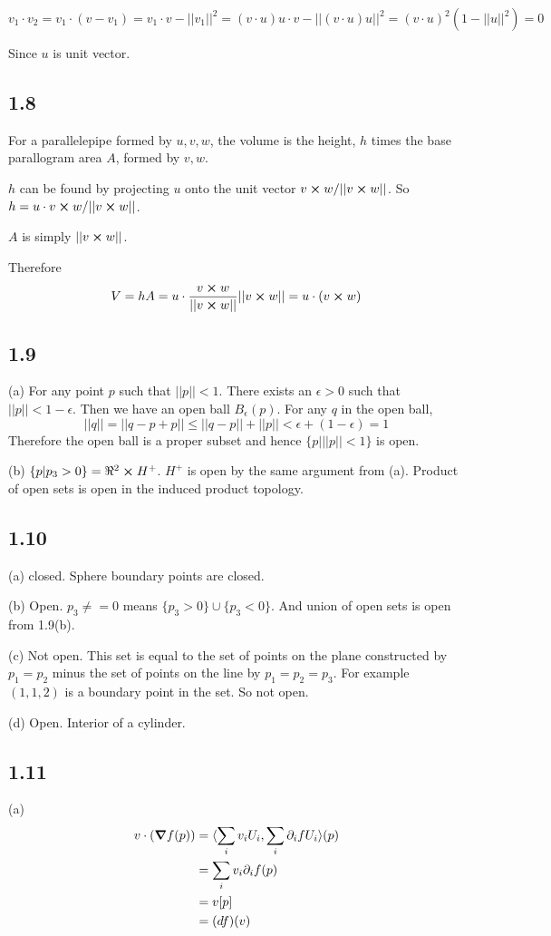 \documentclass[12pt]{article}
\begin{document}
$$ v_1 \cdot v_2 = v_1 \cdot (v - v_1) = v_1 \cdot v - ||v_1||^2 = (v \cdot u)u \cdot v - ||(v\cdot u) u||^2 = (v \cdot u)^2 (1 - ||u||^2) = 0$$ 

Since $u$ is unit vector.

\subsection*{1.8}
For a parallelepipe formed by $u, v, w$, the volume is the height, $h$ times the base parallogram area $A$, formed by $v, w$. 

$h$ can be found by projecting $u$ onto the unit vector $v\cross w / ||v\cross  w||$. So $h = u \cdot v\cross w / ||v\cross  w||$.

$A$ is simply $||v\cross  w||$. 

Therefore$$V = hA = u \cdot \frac{v\cross w}{||v\cross  w||} ||v\cross  w|| = u \cdot (v \cross w)$$

\subsection*{1.9}
(a) For any point $p$ such that $||p||<1$. There exists an $\epsilon > 0$ such that $||p|| < 1 -  \epsilon$. Then we have an open ball $B_\epsilon(p)$. For any $q$ in the open ball,  $$||q|| = ||q - p + p|| \leq ||q - p|| + ||p|| < \epsilon + (1 - \epsilon) = 1$$
Therefore the open ball is a proper subset and hence $\{p | ||p|| < 1\}$ is open.

(b) $\{p | p_3 > 0\} = \real^2 \cross H^+$. $H^+$ is open by the same argument from (a). Product of open sets is open in the induced product topology.

\subsection*{1.10}
(a) closed. Sphere boundary points are closed.

(b) Open.  $p_3\neq =0$ means $\{ p_3 > 0 \} \cup \{p_3 < 0\}$. And union of open sets is open from 1.9(b).

(c) Not open. This set is equal to the set of points on the plane constructed by $p_1=p_2$ minus the set of points on the line by $p_1=p_2 =p_3$. For example $(1,1,2)$ is a boundary point in the set. So not open.

(d) Open. Interior of a cylinder.

\subsection*{1.11}
(a) 
$$\begin{aligned}
	v \cdot (\grad{f}(p)) &= \langle \sum_i v_i U_i, \sum_i \partial_if U_i \rangle (p)\\
		&= \sum_i v_i \partial_i f (p) \\
		&= v[p] \\
		&= (df)(v)
\end{aligned}
$$
\end{document}
